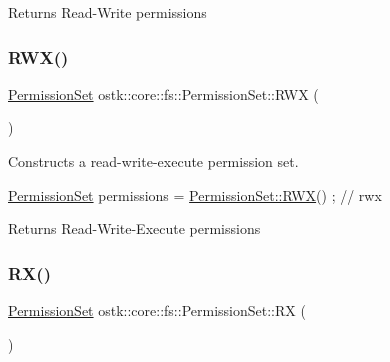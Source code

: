 \begin{DoxyReturn}{Returns}
Read-\/\+Write permissions 
\end{DoxyReturn}
\mbox{\label{classostk_1_1core_1_1fs_1_1_permission_set_a9298592527e35edb785430f03e83e79f}} 
\subsubsection{\texorpdfstring{R\+W\+X()}{RWX()}}
{\footnotesize\ttfamily \hyperlink{classostk_1_1core_1_1fs_1_1_permission_set}{Permission\+Set} ostk\+::core\+::fs\+::\+Permission\+Set\+::\+R\+WX (\begin{DoxyParamCaption}{ }\end{DoxyParamCaption})\hspace{0.3cm}{\ttfamily [static]}}



Constructs a read-\/write-\/execute permission set. 


\begin{DoxyCode}
\hyperlink{classostk_1_1core_1_1fs_1_1_permission_set_a31c918014e874ceac487e92d0d3ac5a2}{PermissionSet} permissions = \hyperlink{classostk_1_1core_1_1fs_1_1_permission_set_a9298592527e35edb785430f03e83e79f}{PermissionSet::RWX}() ; \textcolor{comment}{// rwx}
\end{DoxyCode}


\begin{DoxyReturn}{Returns}
Read-\/\+Write-\/\+Execute permissions 
\end{DoxyReturn}
\mbox{\label{classostk_1_1core_1_1fs_1_1_permission_set_a42a72499579b9639c112613effb2c128}} 
\subsubsection{\texorpdfstring{R\+X()}{RX()}}
{\footnotesize\ttfamily \hyperlink{classostk_1_1core_1_1fs_1_1_permission_set}{Permission\+Set} ostk\+::core\+::fs\+::\+Permission\+Set\+::\+RX (\begin{DoxyParamCaption}{ }\end{DoxyParamCaption})\hspace{0.3cm}{\ttfamily [static]}}



